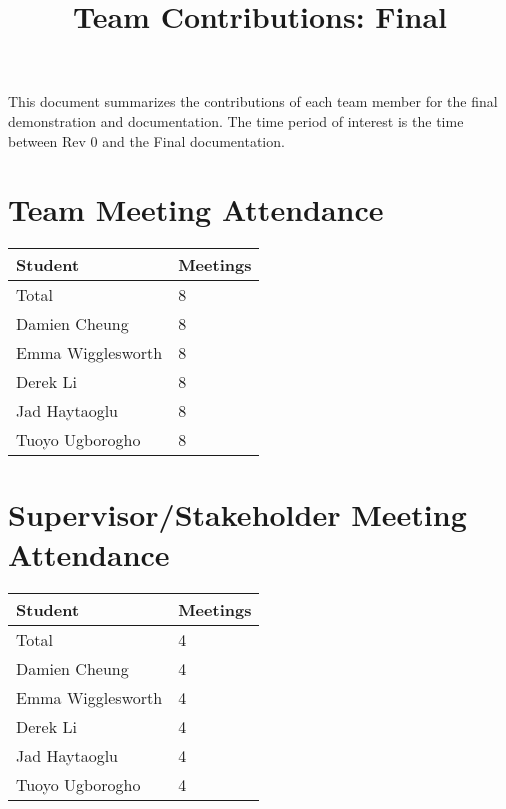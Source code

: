 \documentclass{article}
\title{Team Contributions: Final\\\progname}
\author{\authname}
\date{}
\begin{document}
\maketitle

This document summarizes the contributions of each team member for the final
demonstration and documentation.  The time period of interest is the time
between Rev 0 and the Final documentation.

\section{Team Meeting Attendance}

\begin{table}[H]
\centering
\begin{tabular}{ll}
\toprule
\textbf{Student} & \textbf{Meetings}\\
\midrule
Total & 8\\
Damien Cheung & 8\\
Emma Wigglesworth & 8\\
Derek Li & 8\\
Jad Haytaoglu & 8\\
Tuoyo Ugborogho & 8\\
\bottomrule
\end{tabular}
\end{table}


\section{Supervisor/Stakeholder Meeting Attendance}

\begin{table}[H]
\centering
\begin{tabular}{ll}
\toprule
\textbf{Student} & \textbf{Meetings}\\
\midrule
Total & 4\\
Damien Cheung & 4\\
Emma Wigglesworth & 4\\
Derek Li & 4\\
Jad Haytaoglu & 4\\
Tuoyo Ugborogho & 4\\
\bottomrule
\end{tabular}
\end{table}

\end{document}
